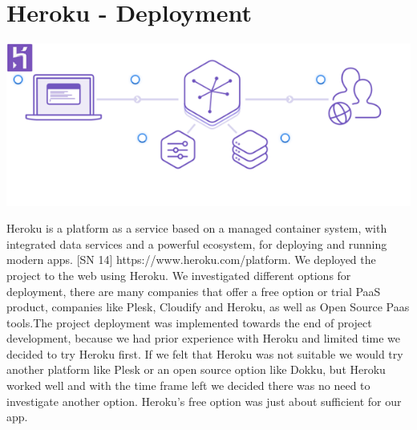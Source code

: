 \section{Heroku - Deployment}
\begin{center}    
      \includegraphics{img/HerokuArchitecture.png}
\end{center}
Heroku is a platform as a service based on a managed container system, with integrated data services and a powerful ecosystem, for deploying and running modern apps. [SN 14] https://www.heroku.com/platform.
We deployed the project to the web using Heroku. We investigated different options for deployment, there are many companies that offer a free option or trial PaaS product, companies like Plesk, Cloudify and Heroku, as well as Open Source Paas tools.The project deployment was implemented towards the end of project development, because we had prior experience with Heroku and limited time we decided to try Heroku first. If we felt that Heroku was not suitable we would try another platform like Plesk or an open source option like Dokku, but Heroku worked well and with the time frame left we decided there was no need to investigate another option. Heroku's free option was just about sufficient for our app.

